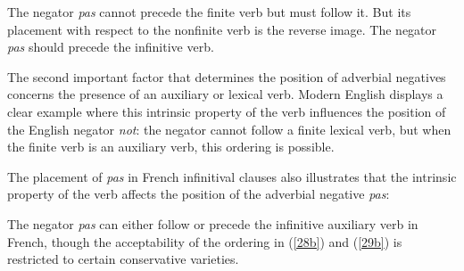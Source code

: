 \documentclass[output=paper
                ,modfonts
                		,nonflat
	        ,collection
	        ,collectionchapter
	        ,collectiontoclongg
 	        ,biblatex
                ,babelshorthands
                ,newtxmath
                ,draftmode
                ,colorlinks, citecolor=brown
]{./langsci/langscibook}
\begin{document}
{\begin{exe}
\begin{xlist}
\begin{exe}
\begin{xlist}
\eal{}
\zl

\noindent
The negator \textit{pas} cannot precede the finite verb
but must follow it. But its placement with respect to
the nonfinite verb is the reverse image. The negator \textit{pas}
should precede the infinitive verb.

The second important factor that determines the position of adverbial
negatives concerns the presence of an auxiliary or lexical  verb.
Modern English displays a clear example where this
intrinsic property of the verb influences the position of
the English negator \textit{not}: the negator cannot follow
a finite lexical  verb, but when the finite verb is an auxiliary verb,
this ordering is possible.

\eal
{}
\zl

\noindent
The placement of \textit{pas} in French infinitival
clauses also illustrates that the intrinsic property of
the verb affects the position of the adverbial negative \textit{pas}:

\eal
{}
 \label{28b}
\zl

\eal
{}
 \label{29b}
\zl

\noindent
The negator \textit{pas} can either follow or precede the infinitive
auxiliary verb in French, though the acceptability of the
ordering in (\ref{28b}) and (\ref{29b}) is restricted to certain conservative
varieties.


\end{xlist}
\end{exe}
\end{xlist}
\end{exe}}
\end{document}
